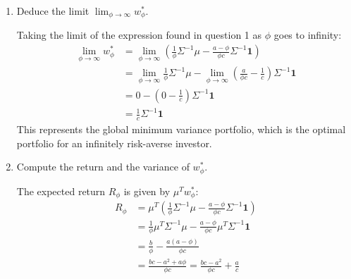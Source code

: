 \begin{enumerate}
            Now substitute $\lambda$ back into the expression for $w$ to find the optimal portfolio weights $w_{\phi}^{*}$:
            \begin{align*}
                  w_{\phi}^{*} & = \frac{1}{\phi}\Sigma^{-1}\mu - \frac{1}{\phi} \left( \frac{a - \phi}{c} \right) \Sigma^{-1}\mathbf{1} \\
                  w_{\phi}^{*} & = \frac{1}{\phi}\Sigma^{-1}\mu - \frac{a - \phi}{\phi c}\Sigma^{-1}\mathbf{1}
            \end{align*}

      \item Deduce the limit $\lim_{\phi\rightarrow\infty}w_{\phi}^{*}$.

            Taking the limit of the expression found in question 1 as $\phi$ goes to infinity:
            \begin{align*}
                  \lim_{\phi\rightarrow\infty} w_{\phi}^{*} & = \lim_{\phi\rightarrow\infty} \left( \frac{1}{\phi}\Sigma^{-1}\mu - \frac{a - \phi}{\phi c}\Sigma^{-1}\mathbf{1} \right)                                      \\
                                                            & = \lim_{\phi\rightarrow\infty} \frac{1}{\phi}\Sigma^{-1}\mu - \lim_{\phi\rightarrow\infty} \left( \frac{a}{\phi c} - \frac{1}{c} \right) \Sigma^{-1}\mathbf{1} \\
                                                            & = 0 - \left(0 - \frac{1}{c}\right)\Sigma^{-1}\mathbf{1}                                                                                                        \\
                                                            & = \frac{1}{c}\Sigma^{-1}\mathbf{1}
            \end{align*}
            This represents the global minimum variance portfolio, which is the optimal portfolio for an infinitely risk-averse investor.

      \item Compute the return and the variance of $w_{\phi}^{*}$.

            The expected return $R_{\phi}$ is given by $\mu^{T}w_{\phi}^{*}$:
            \begin{align*}
                  R_{\phi} & = \mu^{T} \left( \frac{1}{\phi}\Sigma^{-1}\mu - \frac{a - \phi}{\phi c}\Sigma^{-1}\mathbf{1} \right) \\
                           & = \frac{1}{\phi}\mu^{T}\Sigma^{-1}\mu - \frac{a - \phi}{\phi c}\mu^{T}\Sigma^{-1}\mathbf{1}          \\
                           & = \frac{b}{\phi} - \frac{a(a - \phi)}{\phi c}                                                        \\
                           & = \frac{bc - a^{2} + a\phi}{\phi c} = \frac{bc - a^{2}}{\phi c} + \frac{a}{c}
            \end{align*}


\end{enumerate}
